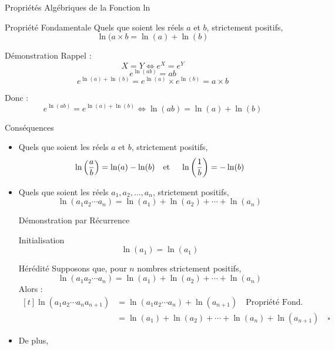 \documentclass{cours}
\begin{document}
    \begin{Gpartie}{Propriétés Algébriques de la Fonction ln}
        \begin{Spartie}{Propriété Fondamentale}
            Quels que soient les réels $a$ et $b$, strictement positifs, 
            \[\ln(a\times b=\ln(a)+\ln(b)\]
            \begin{SSpartie}{Démonstration}
                Rappel : \[X=Y\iff e^X=e^Y\]
                \[e^{\ln(ab)}=ab\]
                \[e^{\ln(a)+\ln(b)}=e^{\ln(a)}\times e^{\ln(b)}=a\times b\]

                Donc : \[e^{\ln(ab)}=e^{\ln(a)+\ln(b)}\iff\ln(ab)=\ln(a)+\ln(b)\]
            \end{SSpartie}
        \end{Spartie}
        \begin{Spartie}{Conséquences}
            \begin{itemize} 
                \item Quels que soient les réels $a$ et $b$, strictement positifs, 
                \[\ln\left(\frac{a}{b}\right)=\ln(a)-\ln(b)\text{\quad et \quad}\ln\left(\frac{1}{b}\right)=-\ln(b)\]
                \item Quels que soient les réels $a_1, a_2,\dotsc, a_n$, strictement positifs, 
                \[\ln(a_1a_2\dotsb a_n)=\ln(a_1)+\ln(a_2)+\dotsb+\ln(a_n)\]
                \begin{SSpartie}{Démonstration par Récurrence}
                    \begin{SSSpartie}{Initialisation}
                        \[\ln(a_1)=\ln(a_1)\]
                    \end{SSSpartie}
                    \begin{SSSpartie}{Hérédité}
                        Supposons que, pour $n$ nombres strictement positifs,
                        \[\ln(a_1a_2\dotsb a_n)=\ln(a_1)+\ln(a_2)+\dotsb+\ln(a_n)\]
                        Alors :
                        \[\begin{aligned}[t]
                            \ln(a_1a_2\dotsb a_na_{n+1})&=\ln(a_1a_2\dotsb a_n)+\ln(a_{n+1})\quad\text{Propriété Fond.} \\
                            &=\ln(a_1)+\ln(a_2)+\dotsb+\ln(a_n)+\ln(a_{n+1})\quad\square
                        \end{aligned}\]
                    \end{SSSpartie}
                \end{SSpartie}
                \item De plus, 

\end{itemize}
\end{Spartie}
\end{Gpartie}
\end{document}
